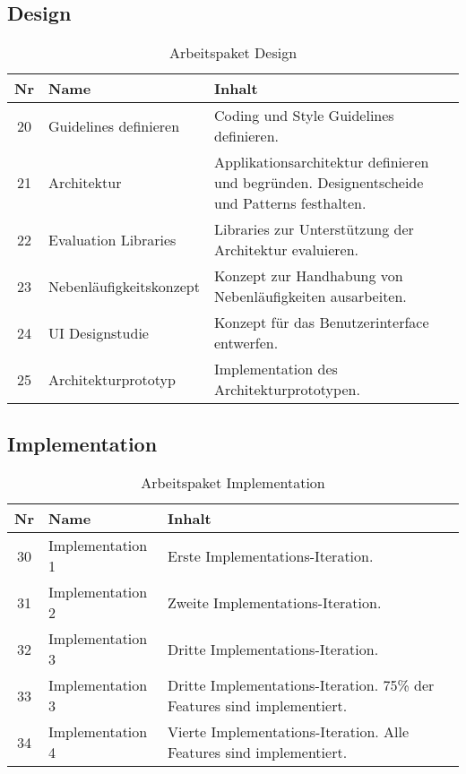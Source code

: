 \subsection{Design}
\begin{table}[H]
\begin{tabularx}{\textwidth}{ c | l | X }
\textbf{Nr} & \textbf{Name} & \textbf{Inhalt} \\ \hline
20 & Guidelines definieren & Coding und Style Guidelines definieren.\\ \hline
21 & Architektur & Applikationsarchitektur definieren und begründen. Designentscheide und Patterns festhalten.\\ \hline
22 & Evaluation Libraries & Libraries zur Unterstützung der Architektur evaluieren.\\ \hline
23 & Nebenläufigkeitskonzept & Konzept zur Handhabung von Nebenläufigkeiten ausarbeiten.\\ \hline
24 & UI Designstudie & Konzept für das Benutzerinterface entwerfen.\\ \hline
25 & Architekturprototyp & Implementation des Architekturprototypen.\\ 
\end{tabularx}
\caption{Arbeitspaket Design}
\end{table}

\subsection{Implementation}
\begin{table}[H]
\begin{tabularx}{\textwidth}{ c | l | X }
\textbf{Nr} & \textbf{Name} & \textbf{Inhalt} \\ \hline
30 & Implementation 1 & Erste Implementations-Iteration. \\ \hline
31 & Implementation 2 & Zweite Implementations-Iteration.\\ \hline
32 & Implementation 3 & Dritte Implementations-Iteration. \\ \hline
33 & Implementation 3 & Dritte Implementations-Iteration. 75\% der Features sind implementiert. \\ \hline
34 & Implementation 4 & Vierte Implementations-Iteration. Alle Features sind implementiert. \\ 
\end{tabularx}
\caption{Arbeitspaket Implementation}
\end{table}

